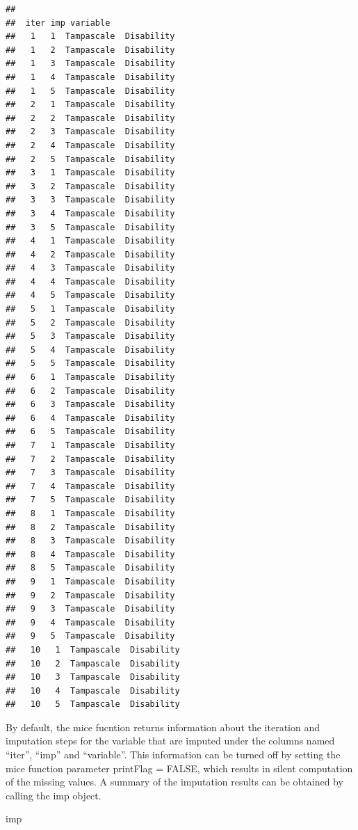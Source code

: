 \documentclass[]{book}
\newenvironment{Shaded}{\begin{snugshade}}{\end{snugshade}}
\newcommand{\NormalTok}[1]{#1}
\begin{document}
\begin{verbatim}
## 
##  iter imp variable
##   1   1  Tampascale  Disability
##   1   2  Tampascale  Disability
##   1   3  Tampascale  Disability
##   1   4  Tampascale  Disability
##   1   5  Tampascale  Disability
##   2   1  Tampascale  Disability
##   2   2  Tampascale  Disability
##   2   3  Tampascale  Disability
##   2   4  Tampascale  Disability
##   2   5  Tampascale  Disability
##   3   1  Tampascale  Disability
##   3   2  Tampascale  Disability
##   3   3  Tampascale  Disability
##   3   4  Tampascale  Disability
##   3   5  Tampascale  Disability
##   4   1  Tampascale  Disability
##   4   2  Tampascale  Disability
##   4   3  Tampascale  Disability
##   4   4  Tampascale  Disability
##   4   5  Tampascale  Disability
##   5   1  Tampascale  Disability
##   5   2  Tampascale  Disability
##   5   3  Tampascale  Disability
##   5   4  Tampascale  Disability
##   5   5  Tampascale  Disability
##   6   1  Tampascale  Disability
##   6   2  Tampascale  Disability
##   6   3  Tampascale  Disability
##   6   4  Tampascale  Disability
##   6   5  Tampascale  Disability
##   7   1  Tampascale  Disability
##   7   2  Tampascale  Disability
##   7   3  Tampascale  Disability
##   7   4  Tampascale  Disability
##   7   5  Tampascale  Disability
##   8   1  Tampascale  Disability
##   8   2  Tampascale  Disability
##   8   3  Tampascale  Disability
##   8   4  Tampascale  Disability
##   8   5  Tampascale  Disability
##   9   1  Tampascale  Disability
##   9   2  Tampascale  Disability
##   9   3  Tampascale  Disability
##   9   4  Tampascale  Disability
##   9   5  Tampascale  Disability
##   10   1  Tampascale  Disability
##   10   2  Tampascale  Disability
##   10   3  Tampascale  Disability
##   10   4  Tampascale  Disability
##   10   5  Tampascale  Disability
\end{verbatim}

By default, the mice fucntion returns information about the iteration
and imputation steps for the variable that are imputed under the columns
named ``iter'', ``imp'' and ``variable''. This information can be turned
off by setting the mice function parameter printFlag = FALSE, which
results in silent computation of the missing values. A summary of the
imputation results can be obtained by calling the imp object.

\begin{Shaded}
\begin{Highlighting}[]
\NormalTok{imp}
\end{Highlighting}
\end{Shaded}
\end{document}
